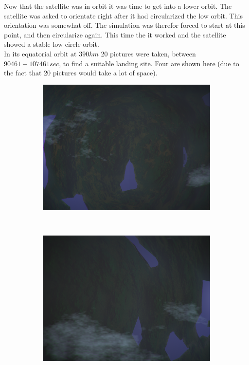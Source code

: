 \documentclass[a4paper, 10pt]{article}
\begin{document}
Now that the satellite was in orbit it was time to get into a lower orbit. The satellite was asked to orientate right after it had circularized the low orbit. This orientation was somewhat off. The simulation was therefor forced to start at this point, and then circularize again. This time the it worked and the satellite showed a stable low circle orbit.\\

In its equatorial orbit at $390 km$ 20 pictures were taken, between $ 90461-107461 sec$, to find a suitable landing site. Four are shown here (due to the fact that 20 pictures would take a lot of space).

\begin{figure}[H]
\centering
\begin{subfigure}[t]{0.5\textwidth}
\centering
\includegraphics[width=\textwidth]{Image0005.png}
\end{subfigure}%
~
\begin{subfigure}[t]{0.5\textwidth}
\centering
\includegraphics[width=\textwidth]{Image0006.png}

\end{subfigure}
\end{figure}
\end{document}
